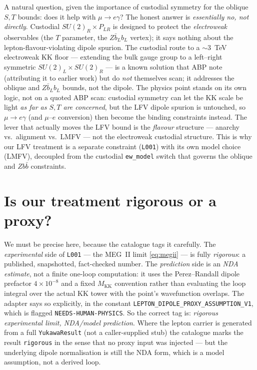 \documentclass[11pt]{article}
\newcommand{\MKK}{M_{\mathrm{KK}}}
\newcommand{\code}[1]{\texttt{#1}}
\theoremstyle{definition}
\begin{document}
A natural question, given the importance of custodial symmetry for the oblique
$S,T$ bounds: does it help with $\mu\to e\gamma$? The honest answer is
\emph{essentially no, not directly}. Custodial $SU(2)_R\times P_{LR}$ is designed
to protect the \emph{electroweak} observables (the $T$ parameter, the
$Z\bar b_L b_L$ vertex); it says nothing about the lepton-flavour-violating dipole
spurion. The custodial route to a $\sim 3$~TeV electroweak KK floor --- extending
the bulk gauge group to a left--right symmetric $SU(2)_L\times SU(2)_R$ --- is a
known solution that ABP note (attributing it to earlier work) but do \emph{not}
themselves scan; it addresses the oblique and $Z\bar b_L b_L$ bounds, not the
dipole. The physics point stands on its own logic, not on a quoted ABP scan:
custodial symmetry can let the KK scale be light \emph{as far as $S,T$ are
concerned}, but the LFV dipole spurion is untouched, so $\mu\to e\gamma$ (and
$\mu$--$e$ conversion) then become the binding constraints instead. The lever that
actually moves the LFV bound is the
\emph{flavour} structure --- anarchy vs.\ alignment vs.\ LMFV --- not the
electroweak custodial structure. This is why our LFV treatment is a separate
constraint (\code{L001}) with its own model choice (LMFV), decoupled from the
custodial \code{ew\_model} switch that governs the oblique and $Zb\bar b$
constraints.

\section{Is our treatment rigorous or a proxy?}
\label{sec:rigorous}

We must be precise here, because the catalogue tags it carefully. The
\emph{experimental} side of \code{L001} --- the MEG~II limit \eqref{eq:megii} ---
is fully \emph{rigorous}: a published, snapshotted, fact-checked number. The
\emph{prediction} side is an \emph{NDA estimate}, not a finite one-loop
computation: it uses the Perez--Randall dipole prefactor $4\times10^{-8}$ and a
fixed $\MKK$ convention rather than evaluating the loop integral over the actual
KK tower with the point's wavefunction overlaps. The adapter says so explicitly,
in the constant \code{LEPTON\_DIPOLE\_PROXY\_ASSUMPTION\_V1}, which is flagged
\code{NEEDS-HUMAN-PHYSICS}. So the correct tag is: \emph{rigorous experimental
limit, NDA/model prediction}. Where the lepton carrier is generated from a full
\code{YukawaResult} (not a caller-supplied stub) the catalogue marks the result
\code{rigorous} in the sense that no proxy input was injected --- but the
underlying dipole normalisation is still the NDA form, which is a model
assumption, not a derived loop.
\end{document}
